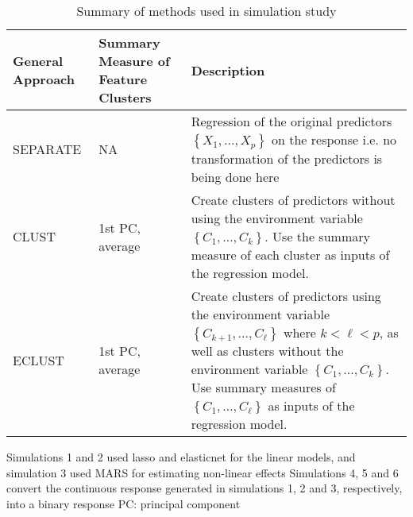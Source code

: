 \begin{table}[h]	
	\begin{threeparttable}
		\caption{Summary of methods used in simulation study}
		\label{tab:methodssim}
		\begin{tabulary}{\linewidth}{lLL}
			\toprule
			General Approach              & Summary Measure of Feature Clusters &  Description \\ \midrule
			SEPARATE       & NA& Regression of the original predictors $\left\lbrace X_1, \ldots, X_p\right\rbrace$ on the response i.e. no transformation of the predictors is being done here \\
			CLUST & 1st PC, average & Create clusters of predictors without using the environment variable $\left\lbrace C_1, \ldots, C_k\right\rbrace$. Use the summary measure of each cluster as inputs of the regression model.\\
			ECLUST & 1st PC, average & Create clusters of predictors using the environment variable $\left\lbrace C_{k+1}, \ldots, C_{\ell} \right\rbrace$ where $k < \ell < p$, as well as clusters without the environment variable $\left\lbrace C_1, \ldots, C_k\right\rbrace$. Use summary measures of $\left\lbrace C_{1}, \ldots, C_{\ell} \right\rbrace$ as inputs of the regression model. \\ \bottomrule
		\end{tabulary}
		\begin{tablenotes}
			{\footnotesize
			Simulations 1 and 2  used lasso and elasticnet for the linear models, and simulation 3 used MARS for estimating non-linear effects
			Simulations 4, 5 and 6 convert the continuous response generated in simulations 1, 2 and 3, respectively, into a binary response
			PC: principal component
				
			}
		\end{tablenotes} 		
	\end{threeparttable}
\end{table}	